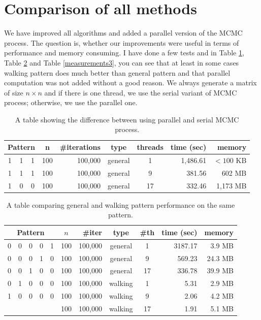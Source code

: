 \section{Comparison of all methods}
We have improved all algorithms and added a parallel version of the MCMC process. The question is, whether our improvements were useful in terms of performance and memory consuming. I have done a few tests and in Table \ref{measurements1}, Table \ref{measurements2} and Table \ref{measurements3}, you can see that at least in some cases walking pattern does much better than general pattern and that parallel computation was not added without a good reason. We always generate a matrix of size $n\times n$ and if there is one thread, we use the serial variant of MCMC process; otherwise, we use the parallel one.
\begin{table}[]
\centering
\begin{tabular}{|ccc|c|r|c|c|r|r|}
\hline
\multicolumn{3}{|c|}{\textbf{Pattern}} & \textbf{n} & \textbf{\#iterations} & \textbf{type} & \textbf{threads} & \textbf{time (sec)} & \textbf{memory} \\ \hline
1 & 1 & 1 & 100 & 100,000 & general & 1 & 1,486.61 & $<100$ KB \\ \cline{4-9} 
1 & 1 & 1 & 100 & 100,000 & general & 9 & 381.56 & 602 MB \\ \cline{4-9} 
1 & 0 & 0 & 100 & 100,000 & general & 17 & 332.46 & 1,173 MB \\ \hline
\end{tabular}
\caption{A table showing the difference between using parallel and serial MCMC process.}
\label{measurements1}
\end{table}

\begin{table}[]
\centering
\begin{tabular}{|ccccc|c|r|c|c|r|r|}
\hline
\multicolumn{5}{|c|}{\textbf{Pattern}} & \textbf{$n$} & \textbf{\#iter} & \textbf{type} & \textbf{\#th} & \textbf{time (sec)} & \textbf{memory} \\ \hline
0 & 0 & 0 & 0 & 1 & 100 & 100,000 & general & 1 & 3187.17 & 3.9 MB \\ \cline{6-11} 
0 & 0 & 0 & 1 & 0 & 100 & 100,000 & general & 9 & 569.23 & 24.3 MB \\ \cline{6-11} 
0 & 0 & 1 & 0 & 0 & 100 & 100,000 & general & 17 & 336.78 & 39.9 MB \\ \cline{6-11} 
0 & 1 & 0 & 0 & 0 & 100 & 100,000 & walking & 1 & 5.31 & 2.9 MB \\ \cline{6-11} 
1 & 0 & 0 & 0 & 0 & 100 & 100,000 & walking & 9 & 2.06 & 4.2 MB \\ \cline{6-11} 
  &   &   &   &   & 100 & 100,000 & walking & 17 & 1.91 & 5.1 MB \\ \hline
\end{tabular}
\caption{A table comparing general and walking pattern performance on the same pattern.}
\label{measurements2}
\end{table}

